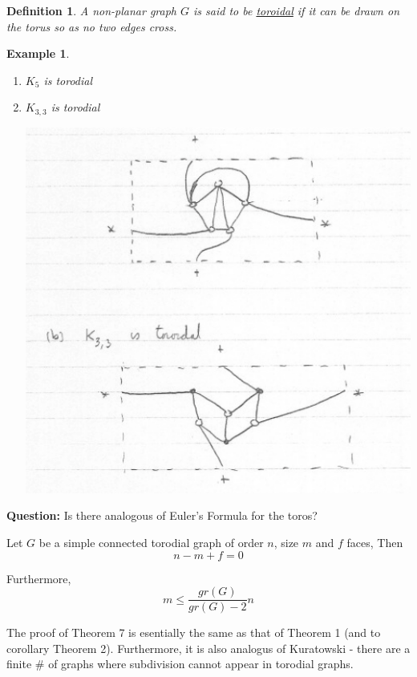 \documentclass[12pt]{article}
\newenvironment{theorem}[1]{%
  \renewcommand\themanualtheoreminner{#1}%
  \manualtheoreminner
}{\endmanualtheoreminner}
\newtheorem{example}{Example}
\newtheorem{definition}{Definition}
\begin{document}
\begin{definition}
	A non-planar graph $G$ is said to be \underline{toroidal} if it can be drawn on the torus so as no two edges cross.
\end{definition}


\begin{example}
	\begin{enumerate}
		\item $K_{5}$ is torodial

		\item $K_{3,3}$ is torodial
		      \begin{center}
			      \includegraphics[scale=0.5]{torodial}
		      \end{center}


	\end{enumerate}

\end{example}


\textbf{Question:} Is there analogous of Euler's Formula for the toros?


\begin{theorem}{7}
	Let $G$ be a simple connected torodial graph of order $n$, size $m$ and $f$ faces, Then
	\[n - m + f = 0\]

	Furthermore,
	\[m \le \frac{gr(G)}{gr(G) - 2} n\]
\end{theorem}

The proof of Theorem 7 is esentially the same as that of Theorem 1 (and to corollary Theorem 2).
Furthermore, it is also analogus of Kuratowski - there are a finite $\#$ of graphs where subdivision cannot appear in torodial graphs.
\end{document}
